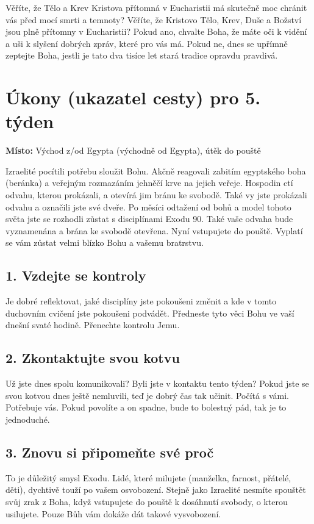 \documentclass[11pt]{article}
\begin{document}
Věříte, že Tělo a Krev Kristova přítomná v Eucharistii má skutečně moc chránit vás před mocí smrti a
temnoty? Věříte, že Kristovo Tělo, Krev, Duše a Božství jsou plně přítomny v Eucharistii? Pokud ano,
chvalte Boha, že máte oči k vidění a uši k slyšení dobrých zpráv, které pro vás má. Pokud ne, dnes se
upřímně zeptejte Boha, jestli je tato dva tisíce let stará tradice opravdu pravdivá.


\newpage
\section*{Úkony (ukazatel cesty) pro 5. týden}

\textbf{Místo:} Východ z/od Egypta (východně od Egypta), útěk do pouště

Izraelité pocítili potřebu sloužit Bohu. Akčně reagovali zabitím egyptského boha (beránka) a veřejným rozmazáním jehněčí krve na jejich veřeje. Hospodin ctí odvahu, kterou prokázali, a otevírá jim bránu ke svobodě. Také vy jste prokázali odvahu a označili jste své dveře. Po měsíci odtažení od bohů a model tohoto světa jste se rozhodli zůstat s disciplínami Exodu 90. Také vaše odvaha bude vyznamenána a brána ke svobodě otevřena. Nyní vstupujete do pouště. Vyplatí se vám zůstat velmi blízko Bohu a vašemu bratrstvu. 

\subsection*{1. Vzdejte se kontroly}
Je dobré reflektovat, jaké disciplíny jste pokoušeni změnit a kde v tomto duchovním cvičení jste pokoušeni podvádět. Předneste tyto věci Bohu ve vaší dnešní svaté hodině. Přenechte kontrolu Jemu.
\subsection*{2. Zkontaktujte svou kotvu}
Už jste dnes spolu komunikovali? Byli jste v kontaktu tento týden? Pokud jste se svou kotvou dnes ještě nemluvili, teď je dobrý čas tak učinit. Počítá s vámi. Potřebuje vás. Pokud povolíte a on spadne, bude to bolestný pád, tak je to jednoduché.
\subsection*{3. Znovu si připomeňte své proč}
To je důležitý smysl Exodu. Lidé, které milujete (manželka, farnost, přátelé, děti), dychtivě touží po vašem osvobození. Stejně jako Izraelité nesmíte spouštět svůj zrak z Boha, když vstupujete do pouště k dosáhnutí svobody, o kterou usilujete. Pouze Bůh vám dokáže dát takové vysvobození.
\end{document}
